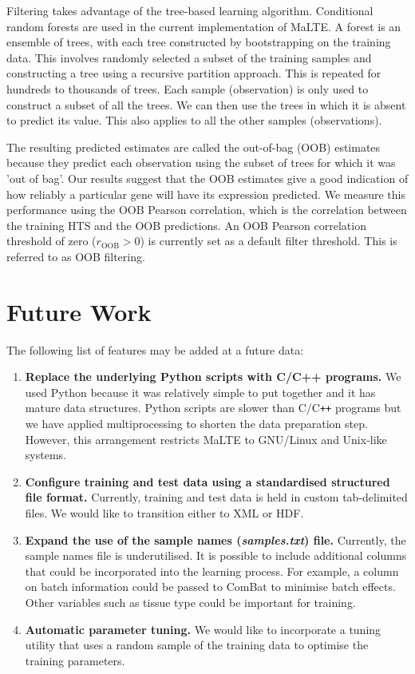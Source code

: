 \documentclass[a4paper,12pt]{article}
\begin{document}
Filtering takes advantage of the tree-based learning algorithm. Conditional random forests are used in the current implementation of \textsf{MaLTE}. A forest is an ensemble of trees, with each tree constructed by bootstrapping on the training data. This involves randomly selected a subset of the training samples and constructing a tree using a recursive partition approach. This is repeated for hundreds to thousands of trees. Each sample (observation) is only used to construct a subset of all the trees. We can then use the trees in which it is absent to predict its value. This also applies to all the other samples (observations).

The resulting predicted estimates are called the out-of-bag (OOB) estimates because they predict each observation using the subset of trees for which it was 'out of bag'. Our results suggest that the OOB estimates give a good indication of how reliably a particular gene will have its expression predicted. We measure this performance using the OOB Pearson correlation, which is the correlation between the training HTS and the OOB predictions. An OOB Pearson correlation threshold of zero ($r_{\mathrm{OOB}} > 0$) is currently set as a default filter threshold. This is referred to as OOB filtering.

\section{Future Work}
\label{future}
The following list of features may be added at a future data:
\begin{enumerate}
\item \textbf{Replace the underlying \textsf{Python} scripts with C/C++ programs.} We used \textsf{Python} because it was relatively simple to put together and it has mature data structures. \textsf{Python} scripts are slower than \textsf{C/C}\verb!++! programs but we have applied multiprocessing to shorten the data preparation step. However, this arrangement restricts \textsf{MaLTE} to GNU/Linux and Unix-like systems.
\item \textbf{Configure training and test data using a standardised structured file format.} Currently, training and test data is held in custom tab-delimited files. We would like to transition either to XML or HDF.
\item \textbf{Expand the use of the sample names (\textit{samples.txt}) file.} Currently, the sample names file is underutilised. It is possible to include additional columns that could be incorporated into the learning process. For example, a column on batch information could be passed to \textsf{ComBat} to minimise batch effects. Other variables such as tissue type could be important for training.
\item \textbf{Automatic parameter tuning.} We would like to incorporate a tuning utility that uses a random sample of the training data to optimise the training parameters.
\end{enumerate}
\end{document}

